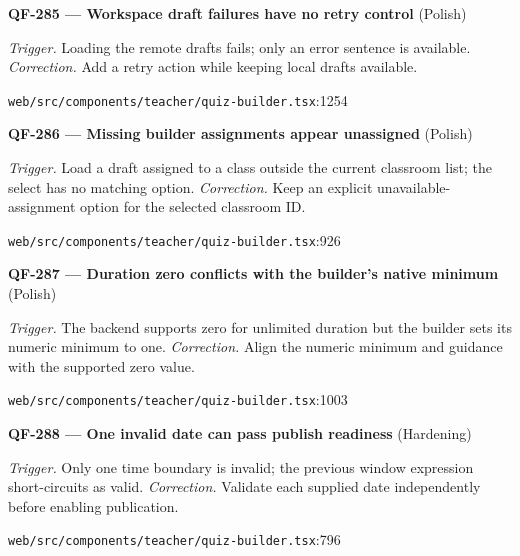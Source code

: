 \begin{minipage}{\linewidth}
\textbf{QF-285 --- Workspace draft failures have no retry control} {\scriptsize\color{accent}(Polish)}\par
\textit{Trigger.} Loading the remote drafts fails; only an error sentence is available. \textit{Correction.} Add a retry action while keeping local drafts available.\par
{\scriptsize\color{muted}\nolinkurl{web/src/components/teacher/quiz-builder.tsx}:1254}\par
\end{minipage}\par\vspace{7pt}
\begin{minipage}{\linewidth}
\textbf{QF-286 --- Missing builder assignments appear unassigned} {\scriptsize\color{accent}(Polish)}\par
\textit{Trigger.} Load a draft assigned to a class outside the current classroom list; the select has no matching option. \textit{Correction.} Keep an explicit unavailable-assignment option for the selected classroom ID.\par
{\scriptsize\color{muted}\nolinkurl{web/src/components/teacher/quiz-builder.tsx}:926}\par
\end{minipage}\par\vspace{7pt}
\begin{minipage}{\linewidth}
\textbf{QF-287 --- Duration zero conflicts with the builder's native minimum} {\scriptsize\color{accent}(Polish)}\par
\textit{Trigger.} The backend supports zero for unlimited duration but the builder sets its numeric minimum to one. \textit{Correction.} Align the numeric minimum and guidance with the supported zero value.\par
{\scriptsize\color{muted}\nolinkurl{web/src/components/teacher/quiz-builder.tsx}:1003}\par
\end{minipage}\par\vspace{7pt}
\begin{minipage}{\linewidth}
\textbf{QF-288 --- One invalid date can pass publish readiness} {\scriptsize\color{accent}(Hardening)}\par
\textit{Trigger.} Only one time boundary is invalid; the previous window expression short-circuits as valid. \textit{Correction.} Validate each supplied date independently before enabling publication.\par
{\scriptsize\color{muted}\nolinkurl{web/src/components/teacher/quiz-builder.tsx}:796}\par
\end{minipage}\par\vspace{7pt}
